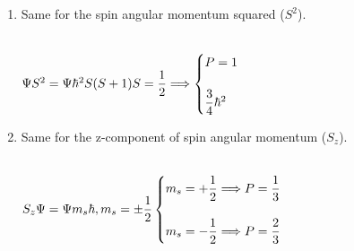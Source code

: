 \documentclass[fleqn]{article}
\begin{document}
\begin{enumerate}
\begin{enumerate}
      \item Same for the spin angular momentum squared ($S^2$).

        \textcolor{hwColor}{
          \\
          $
            \Psi S^2=\Psi \hbar^2 S(S+1)
            \\
            \\
            S=\dfrac{1}{2} \Longrightarrow \begin{cases}
              P=1
              \\
              \\
              \dfrac{3}{4} \hbar^2
            \end{cases}
          $
          \\
        }

      \item Same for the z-component of spin angular momentum ($S_z$).

        \textcolor{hwColor}{
          \\
          $
            S_z \Psi=\Psi m_s \hbar, m_s=\pm\dfrac{1}{2}
            \\
            \\
            \begin{cases}
              m_s=+\dfrac{1}{2} \Longrightarrow P=\dfrac{1}{3}
              \\
              \\
              m_s=-\dfrac{1}{2} \Longrightarrow P=\dfrac{2}{3}
            \end{cases}
            \\
          $
        }

    \end{enumerate}

  \end{enumerate}
\end{document}
